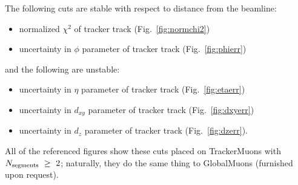 \documentclass[12pt]{article}
\newcommand{\s}[1]{{\mbox{\scriptsize #1}}}
\begin{document}
The following cuts are stable with respect to distance from the
beamline:
\begin{itemize}
\item normalized $\chi^2$ of tracker track (Fig.~\ref{fig:normchi2})
\item uncertainty in $\phi$ parameter of tracker track (Fig.~\ref{fig:phierr})
\end{itemize}
and the following are unstable:
\begin{itemize}
\item uncertainty in $\eta$ parameter of tracker track (Fig.~\ref{fig:etaerr})
\item uncertainty in $d_{xy}$ parameter of tracker track (Fig.~\ref{fig:dxyerr})
\item uncertainty in $d_z$ parameter of tracker track (Fig.~\ref{fig:dzerr}).
\end{itemize}

All of the referenced figures show these cuts placed on TrackerMuons
with $N_\s{segments}~\ge~2$; naturally, they do the same thing to
GlobalMuons (furnished upon request).
\end{document}
